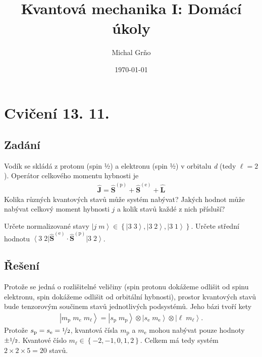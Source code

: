 \documentclass[10pt,a4paper]{article}
\newcommand{\const}[1]{\text{#1}}
\newcommand{\bra}[1]{\left< #1 \right|}
\newcommand{\ket}[1]{\left| #1 \right>}
\newcommand{\bhat}[1]{\hat{\bm{#1}}}
\begin{document}
\title{Kvantová mechanika I: Domácí úkoly}
\author{Michal Grňo}
\date{\today}

\maketitle

\section{Cvičení 13. 11.}

\subsection{Zadání}
Vodík se skládá z protonu (spin ½) a elektronu (spin ½) v orbitalu \textit{d} (tedy $\ell=2$). Operátor celkového momentu hybnosti je
\begin{gather*}
    \bhat{J} = \bhat{S}^{(\const{p})} + \bhat{S}^{(\const{e})} + \bhat{L}
\end{gather*}
Kolika různých kvantových stavů může systém nabývat? Jakých hodnot může nabývat celkový moment hybnosti $j$ a kolik stavů každé z nich přísluší?

Určete normalizované stavy $\ket{j \; m} \in \left\{ \ket{3 \; 3}, \ket{3 \; 2}, \ket{3 \; 1} \right\}$. Určete střední hodnotu $\bra{3 \; 2} \bhat{S}^{(\const{e})} \cdot \bhat{S}^{(\const{p})} \ket{3 \; 2}$.

\subsection{Řešení}
Protože se jedná o rozlišitelné veličiny (spin protonu dokážeme odlišit od spinu elektronu, spin dokážeme odlišit od orbitální hybnosti), prostor kvantových stavů bude tenzorovým součinem stavů jednotlivých podsystémů. Jeho bázi tvoří kety
\begin{gather*}
    \ket{m_\const{p} \; m_e \; m_\ell} = \ket{s_\const{p} \; m_\const{p}} \otimes \ket{s_\const{e} \; m_\const{e}} \otimes \ket{\ell \; m_\ell}.
\end{gather*}
Protože $s_\const{p} = s_\const{e} = \nicefrac{1}{2}$, kvantová čísla $m_\const{p}$ a $m_\const{e}$ mohou nabývat pouze hodnoty $\pm \nicefrac{1}{2}$. Kvantové číslo $m_\ell \in \left\{ -2, -1, 0, 1, 2 \right\}$. Celkem má tedy systém $2 \times 2 \times 5 = 20$ stavů.
\end{document}
